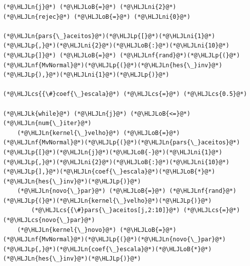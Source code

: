 \documentclass[12pt,a4paper]{article}
\newcommand{\HLJLk}[1]{\textcolor[RGB]{148,91,176}{\textbf{#1}}}
\newcommand{\HLJLn}[1]{#1}
\newcommand{\HLJLnf}[1]{\textcolor[RGB]{66,102,213}{#1}}
\newcommand{\HLJLni}[1]{\textcolor[RGB]{59,151,46}{#1}}
\newcommand{\HLJLoB}[1]{\textcolor[RGB]{102,102,102}{\textbf{#1}}}
\newcommand{\HLJLp}[1]{#1}
\newcommand{\HLJLcs}[1]{\textcolor[RGB]{153,153,119}{\textit{#1}}}
\begin{document}
\begin{lstlisting}
(*@\HLJLn{j}@*) (*@\HLJLoB{=}@*) (*@\HLJLni{2}@*)
(*@\HLJLn{rejec}@*) (*@\HLJLoB{=}@*) (*@\HLJLni{0}@*)

(*@\HLJLn{pars{\_}aceitos}@*)(*@\HLJLp{[}@*)(*@\HLJLni{1}@*)(*@\HLJLp{,}@*)(*@\HLJLni{2}@*)(*@\HLJLoB{:}@*)(*@\HLJLni{10}@*)(*@\HLJLp{]}@*) (*@\HLJLoB{=}@*) (*@\HLJLnf{rand}@*)(*@\HLJLp{(}@*)(*@\HLJLnf{MvNormal}@*)(*@\HLJLp{(}@*)(*@\HLJLn{hes{\_}inv}@*)(*@\HLJLp{),}@*)(*@\HLJLni{1}@*)(*@\HLJLp{)}@*)

(*@\HLJLcs{{\#}coef{\_}escala}@*) (*@\HLJLcs{=}@*) (*@\HLJLcs{0.5}@*)

(*@\HLJLk{while}@*) (*@\HLJLn{j}@*) (*@\HLJLoB{<=}@*) (*@\HLJLn{num{\_}iter}@*)
    (*@\HLJLn{kernel{\_}velho}@*) (*@\HLJLoB{=}@*) (*@\HLJLnf{MvNormal}@*)(*@\HLJLp{(}@*)(*@\HLJLn{pars{\_}aceitos}@*)(*@\HLJLp{[}@*)(*@\HLJLn{j}@*)(*@\HLJLoB{-}@*)(*@\HLJLni{1}@*)(*@\HLJLp{,}@*)(*@\HLJLni{2}@*)(*@\HLJLoB{:}@*)(*@\HLJLni{10}@*)(*@\HLJLp{],}@*)(*@\HLJLn{coef{\_}escala}@*)(*@\HLJLoB{*}@*)(*@\HLJLn{hes{\_}inv}@*)(*@\HLJLp{)}@*)
    (*@\HLJLn{novo{\_}par}@*) (*@\HLJLoB{=}@*) (*@\HLJLnf{rand}@*)(*@\HLJLp{(}@*)(*@\HLJLn{kernel{\_}velho}@*)(*@\HLJLp{)}@*)
        (*@\HLJLcs{{\#}pars{\_}aceitos[j,2:10]}@*) (*@\HLJLcs{=}@*) (*@\HLJLcs{novo{\_}par}@*)
    (*@\HLJLn{kernel{\_}novo}@*) (*@\HLJLoB{=}@*) (*@\HLJLnf{MvNormal}@*)(*@\HLJLp{(}@*)(*@\HLJLn{novo{\_}par}@*)(*@\HLJLp{,}@*)(*@\HLJLn{coef{\_}escala}@*)(*@\HLJLoB{*}@*)(*@\HLJLn{hes{\_}inv}@*)(*@\HLJLp{)}@*)


\end{lstlisting}
\end{document}
